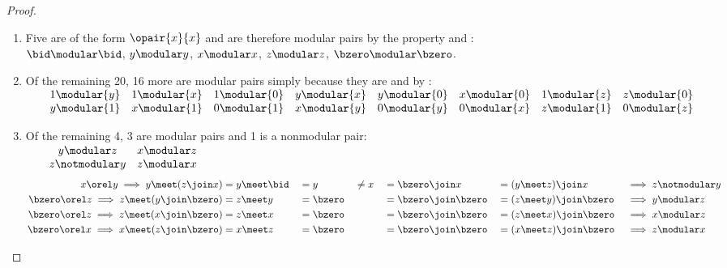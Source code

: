 \begin{proof}
\begin{enumerate}
  \item Five are of the form $\opair{x}{x}$ and are therefore modular pairs 
    by the  property and :
    \\$\bid\modular\bid$, $y\modular y$, $x\modular x$, $z\modular z$, $\bzero\modular \bzero$.
    
  \item Of the remaining 20, 16 more are modular pairs simply because they are 
    and by :
   \\$\begin{array}{@{\qquad}*{8}c}
     {1}\modular{y} & {1}\modular{x} & {1}\modular{0} & {y}\modular{x} & {y}\modular{0} & {x}\modular{0} & {1}\modular{z} & {z}\modular{0} \\
     {y}\modular{1} & {x}\modular{1} & {0}\modular{1} & {x}\modular{y} & {0}\modular{y} & {0}\modular{x} & {z}\modular{1} & {0}\modular{z} 
   \end{array}$

  \item Of the remaining 4, 3 are modular pairs and 1 is a nonmodular pair:
    \\$\begin{array}{@{\qquad}*{2}c}
      y\modular z    & x\modular z \\ 
      z\notmodular y & z\modular x 
    \end{array}$
    \begin{align*}
      x\orel y \implies y\meet(z\join x)
        &= y\meet \bid
       &&= y
       &&\ne  x
       &&= \bzero\join x
       &&= (y\meet z)\join x
       &&\implies z\notmodular y
      \\
      \bzero\orel z \implies z\meet(y\join\bzero)
        &= z\meet y
       &&= \bzero
       &&
       &&= \bzero\join\bzero
       &&= (z\meet y)\join\bzero
       &&\implies y\modular z
      \\
      \bzero\orel z \implies z\meet(x\join\bzero)
        &= z\meet x
       &&= \bzero
       &&
       &&= \bzero\join\bzero
       &&= (z\meet x)\join\bzero
       &&\implies x\modular z
      \\
      \bzero\orel x \implies x\meet(z\join\bzero)
        &= x\meet z
       &&= \bzero
       &&
       &&= \bzero\join\bzero
       &&= (x\meet z)\join\bzero
       &&\implies z\modular x
    \end{align*}
\end{enumerate}
\end{proof}


